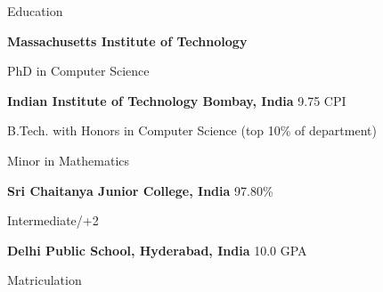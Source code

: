 
\begin{rubric}{Education}

\entry*[2023 -- Present]%
	\textbf{Massachusetts Institute of Technology}
	\par PhD in Computer Science

\entry*[2019 -- 2023]%
	\textbf{Indian Institute of Technology Bombay, India} \hfill 9.75 CPI
	\par B.Tech. with Honors in Computer Science \hfill (top 10\% of department)
	\par Minor in Mathematics


\entry*[2017 -- 2019]%
	\textbf{Sri Chaitanya Junior College, India} \hfill 97.80\% \par
	Intermediate/+2
	

\entry*[2010 -- 2017]%
	\textbf{Delhi Public School, Hyderabad, India} \hfill 10.0 GPA \par
	Matriculation
\end{rubric}
